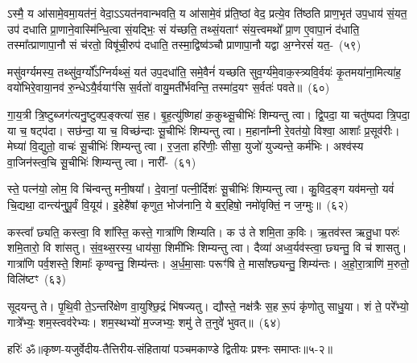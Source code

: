 ऽस्मै॒ य आ॑सामे॒वमा॒यत॑नं॒ वेदा॒\-ऽऽ\-यत॑नवान्भवति॒ य आ॑सामे॒वं प्र॑ति॒ष्ठां वेद॒ प्रत्ये॒व ति॑ष्ठति प्राण॒भृत॑ उप॒धाय॑ सं॒यत॒ उप॑ दधाति प्रा॒णाने॒वास्मि॑न्धि॒त्वा सं॒यद्भिः॒ सं य॑च्छति॒ तथ्सं॒यताꣳ॑ संय॒त्त्वमथो᳚ प्रा॒ण ए॒वापा॒नं द॑धाति॒ तस्मा᳚त्प्राणापा॒नौ सं च॑रतो॒ विषू॑ची॒रुप॑ दधाति॒ तस्मा॒द्विष्व॑ञ्चौ प्राणापा॒नौ यद्वा अ॒ग्नेरसं॑ यत॒-~(५९)\ip

मसु॑वर्ग्यमस्य॒ तथ्सु॑व॒र्ग्यो᳚\-ऽग्निर्यथ्सं॒ यत॑ उप॒\-दधा॑ति॒ समे॒वैनं॑ यच्छति सुव॒र्ग्य॑मे॒वाक॒\-स्त्र्यवि॒र्वयः॑ कृ॒तमया॑ना॒मित्या॑ह॒ वयो॑भिरे॒वाया॒नव॑ रु॒न्धे\-ऽयै॒र्वयाꣳ॑सि स॒र्वतो॑ वायु॒मती᳚र्भवन्ति॒ तस्मा॑द॒यꣳ स॒र्वतः॑ पवते॥~(६०)\ip

{\anuvakamend[{प॒श्चादे॒ताः पु॒रो᳚\-ऽक्ष्ण॒या कल्प॒ते\-ऽसं॑ यतं॒ पञ्च॑त्रिꣳशच्च}]}%

गा॒य॒त्री त्रि॒ष्टुब्जग॑त्यनु॒ष्टुक्प॒ङ्क्त्या॑ स॒ह। बृ॒ह॒त्यु॑ष्णिहा॑ क॒कुथ्सू॒चीभिः॑ शिम्यन्तु त्वा। द्वि॒पदा॒ या चतु॑ष्पदा त्रि॒पदा॒ या च॒ षट्प॑दा। सछ॑न्दा॒ या च॒ विच्छ॑न्दाः सू॒चीभिः॑ शिम्यन्तु त्वा। म॒हाना᳚म्नी रे॒वत॑यो॒ विश्वा॒ आशाः᳚ प्र॒सूव॑रीः। मेघ्या॑ वि॒द्युतो॒ वाचः॑ सू॒चीभिः॑ शिम्यन्तु त्वा। र॒ज॒ता हरि॑णीः॒ सीसा॒ युजो॑ युज्यन्ते॒ कर्म॑भिः। अश्व॑स्य वा॒जिन॑स्त्व॒चि सू॒चीभिः॑ शिम्यन्तु त्वा। नारी᳚-~(६१)\ip

स्ते॒ पत्न॑यो॒ लोम॒ वि चि॑न्वन्तु मनी॒षया᳚। दे॒वानां॒ पत्नी॒र्दिशः॑ सू॒चीभिः॑ शिम्यन्तु त्वा। कु॒विद॒ङ्ग यव॑मन्तो॒ यवं॑ चि॒द्यथा॒ दान्त्य॑नुपू॒र्वं वि॒यूय॑। इ॒हेहै॑षां कृणुत॒ भोज॑नानि॒ ये ब॒र्॒\mbox{}हिषो॒ नमो॑वृक्तिं॒ न ज॒ग्मुः॥~(६२)\ip

{\anuvakamend[{नारी᳚स्त्रि॒ꣳ॒शच्च॑}]}%

कस्त्वा᳚ छ्यति॒ कस्त्वा॒ वि शा᳚स्ति॒ कस्ते॒ गात्रा॑णि शिम्यति। क उ॑ ते शमि॒ता क॒विः। ऋ॒तव॑स्त ऋतु॒धा परुः॑ शमि॒तारो॒ वि शा॑सतु। सं॒व॒थ्स॒रस्य॒ धाय॑सा॒ शिमी॑भिः शिम्यन्तु त्वा। दैव्या॑ अध्व॒र्यव॑स्त्वा॒ छ्यन्तु॒ वि च॑ शासतु। गात्रा॑णि पर्व॒शस्ते॒ शिमाः᳚ कृण्वन्तु॒ शिम्य॑न्तः। अ॒र्ध॒मा॒साः परूꣳ॑षि ते॒ मासा᳚श्छ्यन्तु॒ शिम्य॑न्तः। अ॒हो॒रा॒त्राणि॑ म॒रुतो॒ विलि॑ष्टꣳ~(६३)\ip

सूदयन्तु ते। पृ॒थि॒वी ते॒\-ऽन्तरि॑क्षेण वा॒युश्छि॒द्रं भि॑षज्यतु। द्यौस्ते॒ नक्ष॑त्रैः स॒ह रू॒पं कृ॑णोतु साधु॒या। शं ते॒ परे᳚भ्यो॒ गात्रे᳚भ्यः॒ शम॒स्त्वव॑रेभ्यः। शम॒स्थभ्यो॑ म॒ज्जभ्यः॒ शमु॑ ते त॒नुवे॑ भुवत्॥~(६४)\ip

{\anuvakamend[{विलि॑ष्टन्त्रि॒ꣳ॒शच्च॑}]}%

{हरिः॑ ॐ}{॥कृष्ण-यजुर्वेदीय-तैत्तिरीय-संहितायां पञ्चमकाण्डे द्वितीयः प्रश्नः समाप्तः॥५-२॥}


